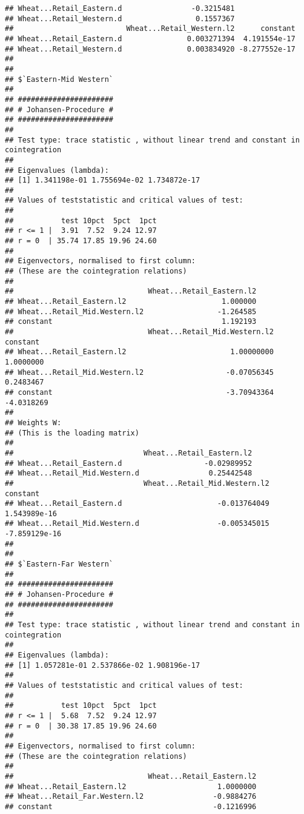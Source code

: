 \documentclass[12pt,]{article}
\begin{document}
\begin{verbatim}
## Wheat...Retail_Eastern.d                -0.3215481
## Wheat...Retail_Western.d                 0.1557367
##                          Wheat...Retail_Western.l2      constant
## Wheat...Retail_Eastern.d               0.003271394  4.191554e-17
## Wheat...Retail_Western.d               0.003834920 -8.277552e-17
## 
## 
## $`Eastern-Mid Western`
## 
## ###################### 
## # Johansen-Procedure # 
## ###################### 
## 
## Test type: trace statistic , without linear trend and constant in cointegration 
## 
## Eigenvalues (lambda):
## [1] 1.341198e-01 1.755694e-02 1.734872e-17
## 
## Values of teststatistic and critical values of test:
## 
##           test 10pct  5pct  1pct
## r <= 1 |  3.91  7.52  9.24 12.97
## r = 0  | 35.74 17.85 19.96 24.60
## 
## Eigenvectors, normalised to first column:
## (These are the cointegration relations)
## 
##                               Wheat...Retail_Eastern.l2
## Wheat...Retail_Eastern.l2                      1.000000
## Wheat...Retail_Mid.Western.l2                 -1.264585
## constant                                       1.192193
##                               Wheat...Retail_Mid.Western.l2   constant
## Wheat...Retail_Eastern.l2                        1.00000000  1.0000000
## Wheat...Retail_Mid.Western.l2                   -0.07056345  0.2483467
## constant                                        -3.70943364 -4.0318269
## 
## Weights W:
## (This is the loading matrix)
## 
##                              Wheat...Retail_Eastern.l2
## Wheat...Retail_Eastern.d                   -0.02989952
## Wheat...Retail_Mid.Western.d                0.25442548
##                              Wheat...Retail_Mid.Western.l2      constant
## Wheat...Retail_Eastern.d                      -0.013764049  1.543989e-16
## Wheat...Retail_Mid.Western.d                  -0.005345015 -7.859129e-16
## 
## 
## $`Eastern-Far Western`
## 
## ###################### 
## # Johansen-Procedure # 
## ###################### 
## 
## Test type: trace statistic , without linear trend and constant in cointegration 
## 
## Eigenvalues (lambda):
## [1] 1.057281e-01 2.537866e-02 1.908196e-17
## 
## Values of teststatistic and critical values of test:
## 
##           test 10pct  5pct  1pct
## r <= 1 |  5.68  7.52  9.24 12.97
## r = 0  | 30.38 17.85 19.96 24.60
## 
## Eigenvectors, normalised to first column:
## (These are the cointegration relations)
## 
##                               Wheat...Retail_Eastern.l2
## Wheat...Retail_Eastern.l2                     1.0000000
## Wheat...Retail_Far.Western.l2                -0.9884276
## constant                                     -0.1216996

\end{verbatim}
\end{document}
